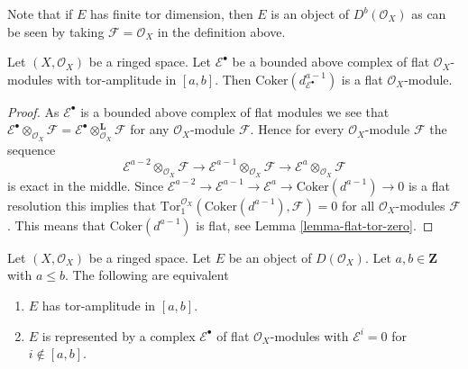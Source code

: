 \noindent
Note that if $E$ has finite tor dimension, then $E$ is an object of
$D^b(\mathcal{O}_X)$ as can be seen by taking $\mathcal{F} = \mathcal{O}_X$
in the definition above.

\begin{lemma}
\label{lemma-last-one-flat}
Let $(X, \mathcal{O}_X)$ be a ringed space.
Let $\mathcal{E}^\bullet$ be a bounded above complex of flat
$\mathcal{O}_X$-modules with tor-amplitude in $[a, b]$.
Then $\text{Coker}(d_{\mathcal{E}^\bullet}^{a - 1})$ is a flat
$\mathcal{O}_X$-module.
\end{lemma}

\begin{proof}
As $\mathcal{E}^\bullet$ is a bounded above complex of flat modules we see that
$\mathcal{E}^\bullet \otimes_{\mathcal{O}_X} \mathcal{F} =
\mathcal{E}^\bullet \otimes_{\mathcal{O}_X}^{\mathbf{L}} \mathcal{F}$
for any $\mathcal{O}_X$-module $\mathcal{F}$.
Hence for every $\mathcal{O}_X$-module $\mathcal{F}$ the sequence
$$
\mathcal{E}^{a - 2} \otimes_{\mathcal{O}_X} \mathcal{F} \to
\mathcal{E}^{a - 1} \otimes_{\mathcal{O}_X} \mathcal{F} \to
\mathcal{E}^a \otimes_{\mathcal{O}_X} \mathcal{F}
$$
is exact in the middle. Since
$\mathcal{E}^{a - 2} \to \mathcal{E}^{a - 1} \to \mathcal{E}^a \to
\text{Coker}(d^{a - 1}) \to 0$
is a flat resolution this implies that
$\text{Tor}_1^{\mathcal{O}_X}(\text{Coker}(d^{a - 1}), \mathcal{F}) = 0$
for all $\mathcal{O}_X$-modules $\mathcal{F}$. This means that
$\text{Coker}(d^{a - 1})$ is flat, see Lemma \ref{lemma-flat-tor-zero}.
\end{proof}

\begin{lemma}
\label{lemma-tor-amplitude}
Let $(X, \mathcal{O}_X)$ be a ringed space.
Let $E$ be an object of $D(\mathcal{O}_X)$.
Let $a, b \in \mathbf{Z}$ with $a \leq b$. The following are equivalent
\begin{enumerate}
\item $E$ has tor-amplitude in $[a, b]$.
\item $E$ is represented by a complex
$\mathcal{E}^\bullet$ of flat $\mathcal{O}_X$-modules with
$\mathcal{E}^i = 0$ for $i \not \in [a, b]$.
\end{enumerate}
\end{lemma}

